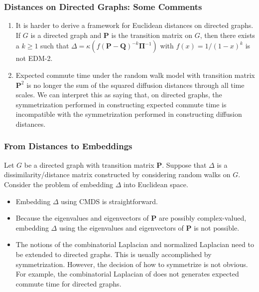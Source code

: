\documentclass[professionalfonts, hyperref={pdfpagelabels=false,
  colorlinks=true, linkcolor=purple}]{beamer}
\begin{document}
\begin{frame}
  \frametitle{Distances on Directed Graphs: Some Comments}
  \begin{enumerate}
  \item  It is harder to derive a framework for Euclidean distances on
    directed graphs. If $G$ is a directed graph and
    $\mathbf{P}$ is the transition matrix on $G$, then there exists a
    $k \geq 1$ such that $\Delta = \kappa(f(\mathbf{P} -
    \mathbf{Q})^{-k} \bm{\Pi}^{-1})$ with $f(x) = 1/(1-x)^{k}$ is not
    EDM-2. 
  \item \vskip10pt Expected commute time under the random walk model with
    transition matrix $\mathbf{P}^{2}$ is no longer the sum of the
    squared diffusion distances through all time scales. We can
    interpret this as saying that, on directed graphs, the
    symmetrization performed in constructing expected commute time is
    incompatible with the symmetrization performed in constructing
    diffusion distances.
  \end{enumerate}
\end{frame}

\begin{frame}
  \frametitle{From Distances to Embeddings}
  Let $G$ be a directed graph with transition matrix
  $\mathbf{P}$. Suppose that $\Delta$ is a dissimilarity/distance
  matrix constructed by considering random walks on $G$. Consider the
  problem of embedding $\Delta$ into Euclidean space.
  \vskip10pt
  \begin{itemize}
  \item Embedding $\Delta$ using CMDS is straightforward.
  \item Because the eigenvalues and
    eigenvectors of $\mathbf{P}$ are possibly complex-valued,
    embedding $\Delta$ using the eigenvalues and eigenvectors of
    $\mathbf{P}$ is not possible. 
  \item The notions of the combinatorial Laplacian and normalized
    Laplacian need to be extended to directed graphs. This is usually
    accomplished by symmetrization. However, the decision of how to
    symmetrize is not obvious. For example, the combinatorial
    Laplacian of \cite{chung05:_laplac_cheeg} does not generates
    expected commute time for directed graphs.
  \end{itemize}
\end{frame}

\end{document}
